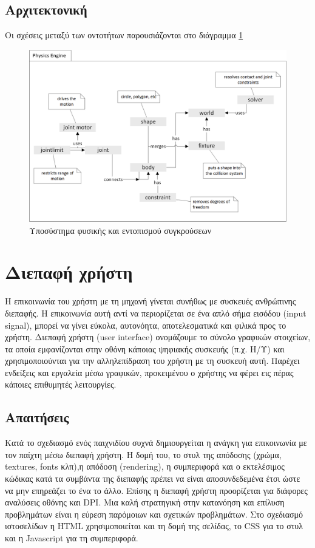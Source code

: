 \subsection{Αρχιτεκτονική}
Οι σχέσεις μεταξύ των οντοτήτων παρουσιάζονται στο διάγραμμα \ref{fig:physics_abstract}
	\begin{figure}[h!]
		\centering
		\includegraphics[width=165mm]{Images/physics_overview}
		\caption{Υποσύστημα φυσικής και εντοπισμού συγκρούσεων}
		\label{fig:physics_abstract}
	\end{figure}
	
\section{Διεπαφή χρήστη}
Η επικοινωνία του χρήστη με τη μηχανή γίνεται συνήθως με συσκευές ανθρώπινης διεπαφής. Η επικοινωνία αυτή αντί να περιορίζεται σε ένα απλό σήμα εισόδου (input signal), μπορεί να γίνει εύκολα, αυτονόητα, αποτελεσματικά και φιλικά προς το χρήστη. Διεπαφή χρήστη (user interface) ονομάζουμε το σύνολο γραφικών στοιχείων, τα οποία εμφανίζονται στην οθόνη κάποιας ψηφιακής συσκευής (π.χ. Η/Υ) και χρησιμοποιούνται για την αλληλεπίδραση του χρήστη με τη συσκευή αυτή. Παρέχει ενδείξεις και εργαλεία μέσω γραφικών, προκειμένου ο χρήστης να φέρει εις πέρας κάποιες επιθυμητές λειτουργίες.

\subsection{Απαιτήσεις}
Κατά το σχεδιασμό ενός παιχνιδίου συχνά δημιουργείται η ανάγκη για επικοινωνία με τον παίχτη μέσω διεπαφή χρήστη. Η δομή του, το στυλ της απόδοσης (χρώμα, textures, fonts κλπ),η απόδοση (rendering), η συμπεριφορά και ο εκτελέσιμος κώδικας κατά τα συμβάντα της διεπαφής πρέπει να είναι αποσυνδεδεμένα έτσι ώστε να μην επηρεάζει το ένα το άλλο. Επίσης η διεπαφή χρήστη προορίζεται για διάφορες αναλύσεις οθόνης και \Gls{DPI}. Μια καλή στρατηγική στην κατανόηση και επίλυση προβλημάτων είναι η εύρεση παρόμοιων και σχετικών προβλημάτων. Στο σχεδιασμό ιστοσελίδων η HTML χρησιμοποιείται και τη δομή της σελίδας, το CSS για το στυλ και η Javascript για τη συμπεριφορά.

